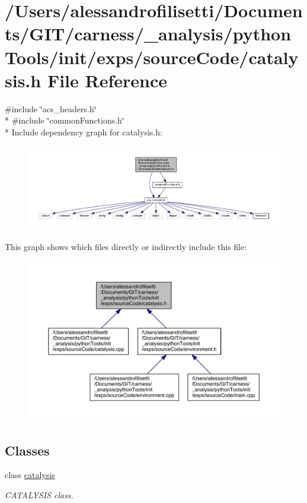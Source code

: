 \hypertarget{a00054}{\section{/\+Users/alessandrofilisetti/\+Documents/\+G\+I\+T/carness/\+\_\+analysis/python\+Tools/init/exps/source\+Code/catalysis.h File Reference}
\label{a00054}
}
{\ttfamily \#include \char`\"{}acs\+\_\+headers.\+h\char`\"{}}\\*
{\ttfamily \#include \char`\"{}common\+Functions.\+h\char`\"{}}\\*
Include dependency graph for catalysis.\+h\+:\nopagebreak
\begin{figure}[H]
\begin{center}
\leavevmode
\includegraphics[width=350pt]{a00168}
\end{center}
\end{figure}
This graph shows which files directly or indirectly include this file\+:\nopagebreak
\begin{figure}[H]
\begin{center}
\leavevmode
\includegraphics[width=350pt]{a00169}
\end{center}
\end{figure}
\subsection*{Classes}
\begin{DoxyCompactItemize}
\item 
class \hyperlink{a00011}{catalysis}
\begin{DoxyCompactList}\small\item\em C\+A\+T\+A\+L\+Y\+S\+I\+S class. \end{DoxyCompactList}\end{DoxyCompactItemize}
